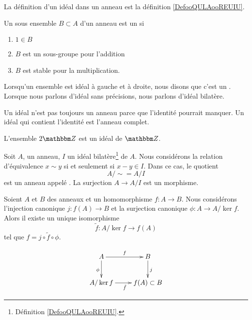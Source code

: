 La définition d'un idéal dans un anneau est la définition \ref{DefooQULAooREUIU}.

\begin{definition}  \label{DefAJVTPxb}
    Un sous ensemble \( B\subset A\) d'un anneau est un  si
    \begin{enumerate}
        \item
            \( 1\in B\)
        \item
            \( B\) est un sous-groupe pour l'addition
        \item
            \( B\) est stable pour la multiplication.
    \end{enumerate}
\end{definition}

Lorsqu'un ensemble est idéal à gauche et à droite, nous disons que c'est un . Lorsque nous parlons d'idéal sans précisions, nous parlons d'idéal bilatère.

\begin{remark}
    Un idéal n'est pas toujours un anneau parce que l'identité pourrait manquer. Un idéal qui contient l'identité est l'anneau complet.
\end{remark}

\begin{example}
    L'ensemble \( 2\eZ\) est un idéal de \( \eZ\).
\end{example}

Soit \( A\), un anneau, \( I\) un idéal bilatère\footnote{Définition \ref{DefooQULAooREUIU}.} de \( A\). Nous considérons la relation d'équivalence \( x\sim y\) si et seulement si \( x-y\in I\). Dans ce cas, le quotient
\begin{equation}
    A/\sim=A/I
\end{equation}
est un anneau appelé . La surjection \( A\to A/I\) est un morphisme.

\begin{proposition}
    Soient \( A\) et \( B\) des anneaux et un homomorphisme \( f\colon A\to B\). Nous considérons l'injection canonique \( j\colon f(A)\to B\) et la surjection canonique \( \phi\colon A\to A/\ker f\). Alors il existe un unique isomorphisme
    \begin{equation}
        \tilde f \colon A/\ker f\to f(A)
    \end{equation}
    tel que \( f=j\circ\tilde f\circ\phi\).

    \begin{equation}
        \xymatrix{%
        A \ar[r]^{f}\ar[d]_{\phi}        &   B\ar[d]^{j}\\
           A/\ker f \ar[r]_{\tilde f}   &   f(A)\subset B
           }
    \end{equation}
\end{proposition}

